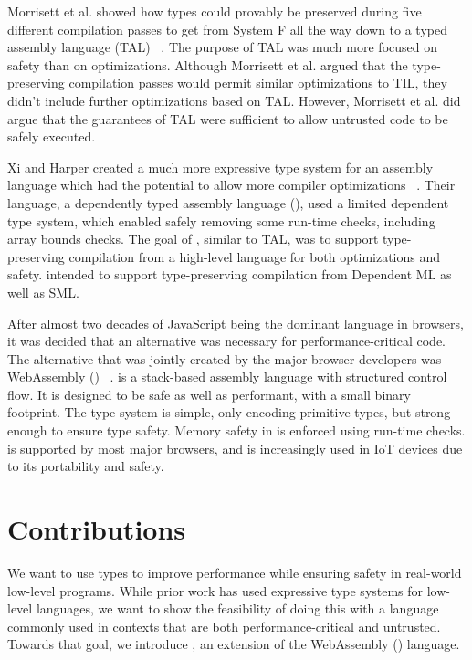 Morrisett et al. showed how types could provably be preserved during five different compilation passes to get from System F all the way down to a typed assembly language (TAL) ~\cite{FtoTAL}.
The purpose of TAL was much more focused on safety than on optimizations.
Although Morrisett et al. argued that the type-preserving compilation passes would permit similar optimizations to TIL, they didn't include further optimizations based on TAL.
However, Morrisett et al. did argue that the guarantees of TAL were sufficient to allow untrusted code to be safely executed.

Xi and Harper created a much more expressive type system for an assembly language which had the potential to allow more compiler optimizations ~\cite{DTAL}.
Their language, a dependently typed assembly language (\dtal), used a limited dependent type system, which enabled safely removing some run-time checks, including array bounds checks.
The goal of \dtal, similar to TAL, was to support type-preserving compilation from a high-level language for both optimizations and safety.
\dtal intended to support type-preserving compilation from Dependent ML as well as SML.


After almost two decades of JavaScript being the dominant language in browsers, it was decided that an alternative was necessary for performance-critical code.
The alternative that was jointly created by the major browser developers was WebAssembly (\wasm) ~\cite{WASM}.
\wasm is a stack-based assembly language with structured control flow.
It is designed to be safe as well as performant, with a small binary footprint.
The \wasm type system is simple, only encoding primitive types, but strong enough to ensure type safety.
Memory safety in \wasm is enforced using run-time checks.
\wasm is supported by most major browsers, and is increasingly used in IoT devices due to its portability and safety.

\section{Contributions}
We want to use types to improve performance while ensuring safety in real-world low-level programs.
While prior work has used expressive type systems for low-level languages, we want to show the feasibility of doing this with a language commonly used in contexts that are both performance-critical and untrusted.
Towards that goal, we introduce \name, an extension of the WebAssembly (\wasm) language.


